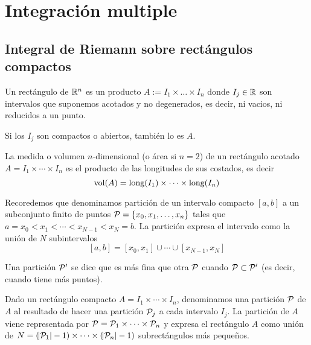 \chapter{Integración multiple}

\section{Integral de Riemann sobre rectángulos compactos}

\begin{defi}
    Un rectángulo de $\mathbb{R}^n$ es un producto $A := I_1 \times \dots \times I_n$
    donde $I_j \in \mathbb{R}$ son intervalos que suponemos acotados y no degenerados,
    es decir, ni vacios, ni reducidos a un punto.

    Si los $I_j$ son compactos o abiertos, también lo es $A$.
\end{defi}

\begin{defi}
    La medida o volumen $n$-dimensional (o área si $n=2$) de un rectángulo
    acotado $A = I_1 \times \cdots \times I_n$ es el producto de las longitudes
    de sus costados, es decir
    \[
        \operatorname{vol}(A) = \text{long} (I_1) \times \dots \times \text{long} (I_n)
    \]
\end{defi}

\begin{obs}
    Recoredemos que denominamos partición de un intervalo compacto $[a,b]$ a un
    subconjunto finito de puntos $\mathcal{P}=\left\{x_0,x_1,\dots,x_n\right\}$ tales que
    $a = x_0 < x_1 < \cdots < x_{N-1} < x_N = b$. La partición expresa el intervalo
    como la unión de $N$ subintervalos
    \[
        [a,b] = [x_0,x_1] \cup \cdots \cup [x_{N-1},x_N]
    \]
\end{obs}
\begin{obs*}
    Una partición $\mathcal{P}^\prime$ se dice que es más fina que otra
    $\mathcal{P}$ cuando $\mathcal{P} \subset \mathcal{P}^\prime$ (es decir, cuando
    tiene más puntos).
\end{obs*}

\begin{defi}
    Dado un rectángulo compacto $A = I_1 \times \cdots \times I_n$, denominamos
    una partición $\mathcal{P}$ de $A$ al resultado de hacer una partición $\mathcal{P}_j$ a cada
    intervalo $I_j$.
    La partición de $A$ viene representada por $\mathcal{P} = \mathcal{P}_1 \times \cdots \times
    \mathcal{P}_n$ y expresa el rectángulo $A$ como unión de $N = (\abs{\mathcal{P}_1}-1) \times
    \cdots \times (\abs{\mathcal{P}_n}-1)$ subrectángulos más pequeños.
\end{defi}

